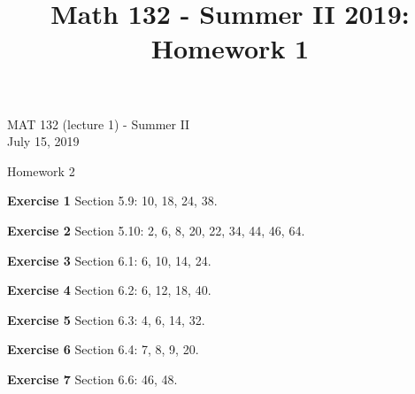 \documentclass[12pt,oneside]{exam}
\title{Math 132 - Summer II 2019: Homework 1}
\newenvironment{exercise}[1]{\vspace{.1in}\noindent\textbf{Exercise #1 \hspace{.05em}}}{}
\begin{document}
\begin{flushright}
\sc MAT 132 (lecture 1) - Summer II\\
July 15, 2019
\end{flushright}
\bigskip

\begin{center}
\textsf{Homework 2} 
\end{center}


\begin{exercise}{1}
Section 5.9: 10, 18, 24, 38.
\end{exercise}

\begin{exercise}{2}
Section 5.10: 2, 6, 8, 20, 22, 34, 44, 46, 64. 
\end{exercise}

\begin{exercise}{3} 
Section 6.1: 6, 10, 14, 24. 
\end{exercise}

\begin{exercise}{4}
Section 6.2: 6, 12, 18, 40. 
\end{exercise}

\begin{exercise}{5}
Section 6.3: 4, 6, 14, 32. 
\end{exercise}

\begin{exercise}{6}
Section 6.4: 7, 8, 9, 20. 
\end{exercise}

\begin{exercise}{7}
Section 6.6: 46, 48. 
\end{exercise}
\end{document}
